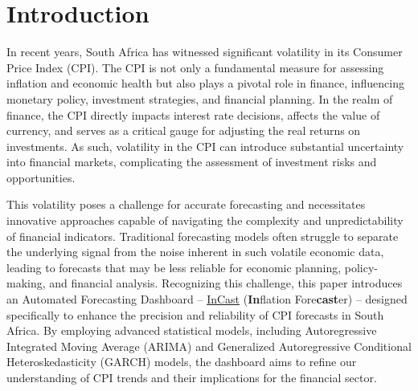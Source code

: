 \documentclass[11pt,preprint, authoryear]{elsarticle}
\numberwithin{equation}{section}
\numberwithin{figure}{section}
\numberwithin{table}{section}
\begin{document}
\setcounter{footnote}{0}


\renewcommand{\contentsname}{Table of Contents}
{\tableofcontents}

\pagestyle{fancy}
\chead{}
\rhead{}
\lfoot{}
\lhead{}
\cfoot{}


\headsep 35pt %




\newpage

\hypertarget{introduction}{%
\section{\texorpdfstring{Introduction
\label{Intro}}{Introduction }}\label{introduction}}

In recent years, South Africa has witnessed significant volatility in
its Consumer Price Index (CPI). The CPI is not only a fundamental
measure for assessing inflation and economic health but also plays a
pivotal role in finance, influencing monetary policy, investment
strategies, and financial planning. In the realm of finance, the CPI
directly impacts interest rate decisions, affects the value of currency,
and serves as a critical gauge for adjusting the real returns on
investments. As such, volatility in the CPI can introduce substantial
uncertainty into financial markets, complicating the assessment of
investment risks and opportunities.

This volatility poses a challenge for accurate forecasting and
necessitates innovative approaches capable of navigating the complexity
and unpredictability of financial indicators. Traditional forecasting
models often struggle to separate the underlying signal from the noise
inherent in such volatile economic data, leading to forecasts that may
be less reliable for economic planning, policy-making, and financial
analysis. Recognizing this challenge, this paper introduces an Automated
Forecasting Dashboard --
\href{https://janpretorius.shinyapps.io/incast/}{InCast}
(\textbf{In}flation Fore\textbf{cast}er) -- designed specifically to
enhance the precision and reliability of CPI forecasts in South Africa.
By employing advanced statistical models, including Autoregressive
Integrated Moving Average (ARIMA) and Generalized Autoregressive
Conditional Heteroskedasticity (GARCH) models, the dashboard aims to
refine our understanding of CPI trends and their implications for the
financial sector.
\end{document}
